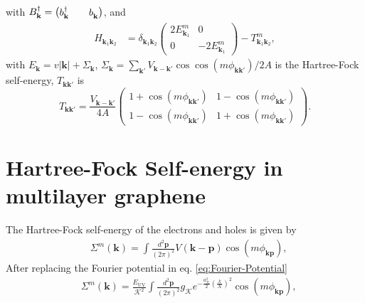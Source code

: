 \documentclass[english,aps,prd,nofootinbib,twocolumn]{revtex4-1}
\begin{document}
with
$B_{\mathbf{k }}^{\textcolor{black}{\dagger}} =
\begin{pmatrix}
b_{\mathbf{k }}^{\textcolor{black}{\dagger}}
&&
b_{\mathbf{k }}^{\textcolor{white}{\dagger}}
\end{pmatrix}$, and 
\begin{equation}
\label{eq:HP-Explicit-Hamiltonian}
\begin{split}
H_{\mathbf{k}_{1}\mathbf{k}_{2}} &= 
\delta_{\mathbf{k}_{1}\mathbf{k}_{2}}
\begin{pmatrix}
2 E^{m}_{\mathbf{k}_{1}}	&	0	\\
0   &   -2 E^{m}_{\mathbf{k}_{1}}
\end{pmatrix} - 
T^{m}_{\mathbf{k}_{1}\mathbf{k}_{2}},
\end{split}
\end{equation}
with $E_{\mathbf{k}} = v|\mathbf{k}| + \Sigma_{\mathbf{k}}$, $\Sigma_{\mathbf{k}} = \sum_{ \mathbf{k'}} 
V_{\mathbf{k-k'}}\cos \cos (m\phi_{\mathbf{k }\mathbf{k'}})/2A$ is the Hartree-Fock self-energy, $T_{\mathbf{kk'}}$ is
\begin{equation}
\label{eq:Interacion-matrix}
T_{\mathbf{kk'}} = 
\frac{V_{\mathbf{k-k'}}}{4A} 
\begin{pmatrix}
    1+\cos (m\phi_{\mathbf{k }\mathbf{k'}})  &    
    1-\cos (m\phi_{\mathbf{k }\mathbf{k'}}) \\  
    1-\cos (m\phi_{\mathbf{k }\mathbf{k'}})  &
    1+\cos (m\phi_{\mathbf{k }\mathbf{k'}})
\end{pmatrix} .   
\end{equation}

\section{Hartree-Fock Self-energy in multilayer graphene}
\label{sect:Self-Energy}

The Hartree-Fock self-energy of the electrons and holes is given by
\begin{equation}
\begin{split}
&\Sigma^{m}(\mathbf{k }) = 
\int \!\! \frac{d^2 \mathbf{p}}{(2\pi)^2}
V(\mathbf{ k-p })\cos(m\phi_{\mathbf{ k p}}),
\end{split}
\end{equation}
After replacing the Fourier potential in eq. \eqref{eq:Fourier-Potential}
\begin{equation}
\begin{split}
&\Sigma^{m}(\mathbf{k }) = \frac{E_{\mathrm{UV}}}{\mathcal{K}^{2}}
\int \!\! \frac{d^2 \mathbf{p}}{(2\pi)^2}
g_{\mathcal{K}}
e^{-\tfrac{a_{\mathcal{K}}^{2}}{2}\left( \tfrac{k}{\mathcal{K}} \right)^{2}}
\cos(m\phi_{\mathbf{ k p}}),
\end{split}
\end{equation}
\end{document}
